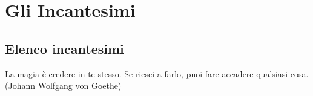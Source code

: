\section{Gli Incantesimi}

\begin{multicols}{2}



\subsection{Elenco incantesimi}

\end{multicols}

\begin{enfasi}
La magia è credere in te stesso. Se riesci a farlo, puoi fare accadere qualsiasi cosa. (Johann Wolfgang von Goethe)
\end{enfasi}

